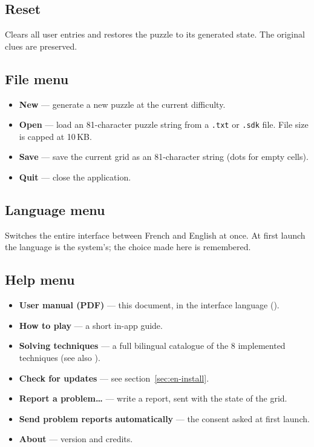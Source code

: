 \subsection{Reset}

Clears all user entries and restores the puzzle to its generated state.
The original clues are preserved.

\subsection{File menu}

\begin{itemize}
  \item \textbf{New} --- generate a new puzzle at the current difficulty.
  \item \textbf{Open} --- load an 81-character puzzle string from a
        \texttt{.txt} or \texttt{.sdk} file. File size is capped at 10\,KB.
  \item \textbf{Save} --- save the current grid as an 81-character string
        (dots for empty cells).
  \item \textbf{Quit} --- close the application.
\end{itemize}

\subsection{Language menu}

Switches the entire interface between French and English at once. At first
launch the language is the system's; the choice made here is remembered.

\subsection{Help menu}

\begin{itemize}
  \item \textbf{User manual (PDF)} --- this document, in the interface language ().
  \item \textbf{How to play} --- a short in-app guide.
  \item \textbf{Solving techniques} --- a full bilingual catalogue of the
        8 implemented techniques (see also ).
  \item \textbf{Check for updates} --- see section~\ref{sec:en-install}.
  \item \textbf{Report a problem\dots} --- write a report, sent with the state of the grid.
  \item \textbf{Send problem reports automatically} --- the consent asked at first launch.
  \item \textbf{About} --- version and credits.
\end{itemize}

